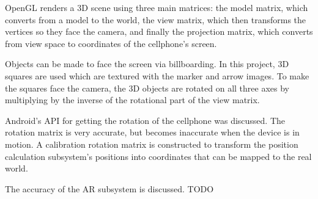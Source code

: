 OpenGL renders a 3D scene using three main matrices: the model matrix, which converts from a model to the world, the view matrix, which then transforms the vertices so they face the camera, and finally the projection matrix, which converts from view space to coordinates of the cellphone's screen.

Objects can be made to face the screen via billboarding. In this project, 3D squares are used which are textured with the marker and arrow images. To make the squares face the camera, the 3D objects are rotated on all three axes by multiplying by the inverse of the rotational part of the view matrix.

Android's API for getting the rotation of the cellphone was discussed. The rotation matrix is very accurate, but becomes inaccurate when the device is in motion. A calibration rotation matrix is constructed to transform the position calculation subsystem's positions into coordinates that can be mapped to the real world.

The accuracy of the AR subsystem is discussed. TODO
